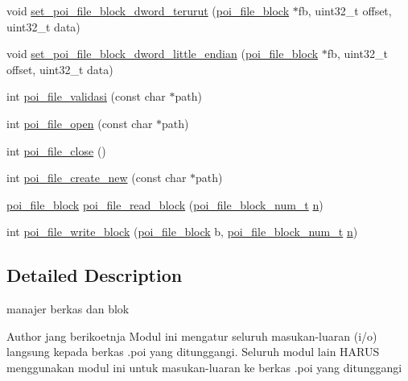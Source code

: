 \begin{DoxyCompactItemize}
\item 
void \hyperlink{file-manager_8c_a384e9cca8b36bc32ca1b92ac410bb7ed}{set\-\_\-poi\-\_\-file\-\_\-block\-\_\-dword\-\_\-terurut} (\hyperlink{structpoi__file__block}{poi\-\_\-file\-\_\-block} $\ast$fb, uint32\-\_\-t offset, uint32\-\_\-t data)
\item 
void \hyperlink{file-manager_8c_aa4d2e01426a89fe14e8c3a9fac2b61a0}{set\-\_\-poi\-\_\-file\-\_\-block\-\_\-dword\-\_\-little\-\_\-endian} (\hyperlink{structpoi__file__block}{poi\-\_\-file\-\_\-block} $\ast$fb, uint32\-\_\-t offset, uint32\-\_\-t data)
\item 
int \hyperlink{file-manager_8c_af091ab9b6704b6affa17ea12fd51e628}{poi\-\_\-file\-\_\-validasi} (const char $\ast$path)
\item 
int \hyperlink{file-manager_8c_ac286b940c82432a07288c7a9afdc884a}{poi\-\_\-file\-\_\-open} (const char $\ast$path)
\item 
int \hyperlink{file-manager_8c_a873cfe2d99ac7a57ff0a391d87c825dd}{poi\-\_\-file\-\_\-close} ()
\item 
int \hyperlink{file-manager_8c_a9a8111f4e7948ad43fef393e0e4e3247}{poi\-\_\-file\-\_\-create\-\_\-new} (const char $\ast$path)
\item 
\hyperlink{structpoi__file__block}{poi\-\_\-file\-\_\-block} \hyperlink{file-manager_8c_ac995e99a526073da84cd4fb1dab93a0a}{poi\-\_\-file\-\_\-read\-\_\-block} (\hyperlink{file-manager_8h_aef709af8fc6566dcaf55b656bb9f8881}{poi\-\_\-file\-\_\-block\-\_\-num\-\_\-t} \hyperlink{allocation-table-test_8c_a24010dade8ebab3f87a48022772cd975}{n})
\item 
int \hyperlink{file-manager_8c_aafd8b089a2a7b6c25cec6ec8c9504e5a}{poi\-\_\-file\-\_\-write\-\_\-block} (\hyperlink{structpoi__file__block}{poi\-\_\-file\-\_\-block} b, \hyperlink{file-manager_8h_aef709af8fc6566dcaf55b656bb9f8881}{poi\-\_\-file\-\_\-block\-\_\-num\-\_\-t} \hyperlink{allocation-table-test_8c_a24010dade8ebab3f87a48022772cd975}{n})
\end{DoxyCompactItemize}


\subsection{Detailed Description}
manajer berkas dan blok \begin{DoxyAuthor}{Author}
jang berikoetnja Modul ini mengatur seluruh masukan-\/luaran (i/o) langsung kepada berkas .poi yang ditunggangi. Seluruh modul lain H\-A\-R\-U\-S menggunakan modul ini untuk masukan-\/luaran ke berkas .poi yang ditunggangi 
\end{DoxyAuthor}



